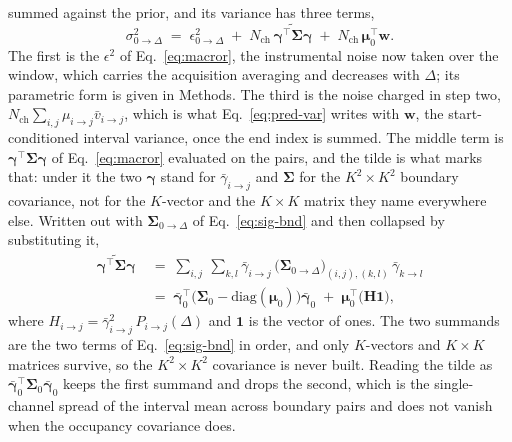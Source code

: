 \begin{appendixbox}
summed against the prior, and its variance has three terms,
\begin{equation}
  \sigma^2_{0\to\Delta} \;=\; \epsilon^2_{0\to\Delta}
  \;+\; N_{\mathrm{ch}}\,\widetilde{\boldsymbol{\gamma}^\top\boldsymbol{\Sigma}\boldsymbol{\gamma}}
  \;+\; N_{\mathrm{ch}}\,\boldsymbol{\mu}_0^\top\mathbf{w}.
  \label{eq:pred-var}
\end{equation}
The first is the $\epsilon^2$ of Eq.~\ref{eq:macror}, the instrumental noise now taken over the
window, which carries the acquisition averaging and decreases with $\Delta$; its parametric
form is given in Methods. The third is the noise charged in step two,
$N_{\mathrm{ch}}\sum_{i,j}\mu_{i\to j}\bar{v}_{i\to j}$, which
is what Eq.~\ref{eq:pred-var} writes with $\mathbf{w}$, the
start-conditioned interval variance, once the end index is summed. The middle term is
$\boldsymbol{\gamma}^\top\boldsymbol{\Sigma}\boldsymbol{\gamma}$ of Eq.~\ref{eq:macror} evaluated on the pairs, and the
tilde is what marks that: under it the two $\boldsymbol{\gamma}$ stand for
$\bar{\gamma}_{i\to j}$ and $\boldsymbol{\Sigma}$ for the $K^2\times K^2$ boundary covariance,
not for the $K$-vector and the $K\times K$ matrix they name everywhere else. Written out with $\boldsymbol{\Sigma}_{0\to\Delta}$
of Eq.~\ref{eq:sig-bnd} and then collapsed by substituting it,
\begin{align}
  \widetilde{\boldsymbol{\gamma}^\top\boldsymbol{\Sigma}\boldsymbol{\gamma}}
  &\;=\; \sum_{i,j}\ \sum_{k,l}
    \bar{\gamma}_{i\to j}\,
    \bigl(\boldsymbol{\Sigma}_{0\to\Delta}\bigr)_{(i,j),(k,l)}\,
    \bar{\gamma}_{k\to l} \nonumber\\[2pt]
  &\;=\; \bar{\boldsymbol{\gamma}}_0^\top\bigl(\boldsymbol{\Sigma}_0-\mathrm{diag}(\boldsymbol{\mu}_0)\bigr)\bar{\boldsymbol{\gamma}}_0
    \;+\; \boldsymbol{\mu}_0^\top\bigl(\mathbf{H}\mathbf{1}\bigr),
  \label{eq:tilde}
\end{align}
where $H_{i\to j} = \bar{\gamma}^2_{i\to j}\,P_{i\to j}(\Delta)$ and $\mathbf{1}$
is the vector of ones. The two summands are the two terms of Eq.~\ref{eq:sig-bnd} in order,
and only $K$-vectors and $K\times K$ matrices survive, so the $K^2\times K^2$ covariance is
never built. Reading the tilde as
$\bar{\boldsymbol{\gamma}}_0^\top\boldsymbol{\Sigma}_0\bar{\boldsymbol{\gamma}}_0$ keeps the first summand and drops
the second, which is the single-channel spread of the interval mean across boundary pairs and
does not vanish when the occupancy covariance does.


\end{appendixbox}
